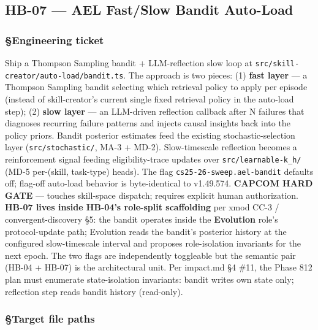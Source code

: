 \documentclass[11pt,letterpaper]{article}
\begin{document}
\subsection{HB-07 — AEL Fast/Slow Bandit Auto-Load}
\subsubsection{§Engineering ticket}

Ship a Thompson Sampling bandit + LLM-reflection slow loop at
\texttt{src/skill-creator/auto-load/bandit.ts}. The approach is two
pieces: (1) \textbf{fast layer} --- a Thompson Sampling bandit selecting
which retrieval policy to apply per episode (instead of skill-creator's
current single fixed retrieval policy in the auto-load step); (2)
\textbf{slow layer} --- an LLM-driven reflection callback after N
failures that diagnoses recurring failure patterns and injects causal
insights back into the policy priors. Bandit posterior estimates feed
the existing stochastic-selection layer (\texttt{src/stochastic/}, MA-3
+ MD-2). Slow-timescale reflection becomes a reinforcement signal
feeding eligibility-trace updates over \texttt{src/learnable-k\_h/}
(MD-5 per-(skill, task-type) heads). The flag
\texttt{cs25-26-sweep.ael-bandit} defaults off; flag-off auto-load
behavior is byte-identical to v1.49.574. \textbf{CAPCOM HARD GATE} ---
touches skill-space dispatch; requires explicit human authorization.
\textbf{HB-07 lives inside HB-04's role-split scaffolding} per xmod CC-3
/ convergent-discovery §5: the bandit operates inside the
\textbf{Evolution} role's protocol-update path; Evolution reads the
bandit's posterior history at the configured slow-timescale interval and
proposes role-isolation invariants for the next epoch. The two flags are
independently toggleable but the semantic pair (HB-04 + HB-07) is the
architectural unit. Per impact.md §4 \#11, the Phase 812 plan must
enumerate state-isolation invariants: bandit writes own state only;
reflection step reads bandit history (read-only).

\subsubsection{§Target file paths}
\end{document}
